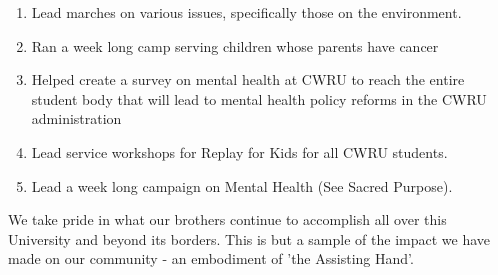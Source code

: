      \begin{enumerate}
      	
      	\item Lead marches on various issues, specifically those on the environment.
      	
      	\item Ran a week long camp serving children whose parents have cancer
      	
      	\item Helped create a survey on mental health at CWRU to reach the entire student body that will lead to mental health policy reforms in the CWRU administration
      	
      	\item Lead service workshops for Replay for Kids for all CWRU students.
      	
      	\item Lead a week long campaign on Mental Health (See Sacred Purpose).
      \end{enumerate}
      
      We take pride in what our brothers continue to accomplish all over this University and beyond its borders. This is but a sample of the impact we have made on our community - an embodiment of 'the Assisting Hand'.